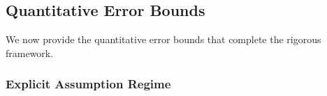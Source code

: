 
\subsection{Quantitative Error Bounds}
\label{subsec:quantitative_errors}

We now provide the quantitative error bounds that complete the rigorous framework.

\subsubsection{Explicit Assumption Regime}

